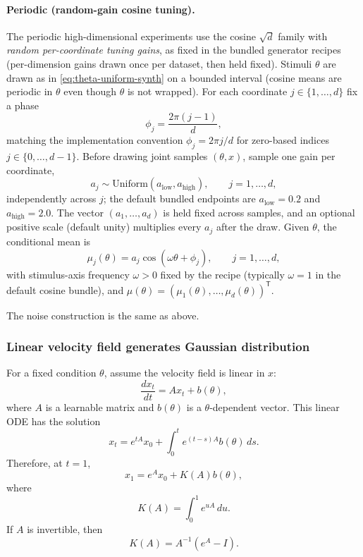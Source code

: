 \paragraph{Periodic (random-gain cosine tuning).}
The periodic high-dimensional experiments use the cosine $\sqrt{d}$ family with \emph{random per-coordinate tuning gains}, as fixed in the bundled generator recipes (per-dimension gains drawn once per dataset, then held fixed).
Stimuli $\theta$ are drawn as in \eqref{eq:theta-uniform-synth} on a bounded interval (cosine means are periodic in $\theta$ even though $\theta$ is not wrapped).
For each coordinate $j\in\{1,\ldots,d\}$ fix a phase
\begin{equation}
  \phi_j = \frac{2\pi(j-1)}{d},
\end{equation}
matching the implementation convention $\phi_j = 2\pi j/d$ for zero-based indices $j\in\{0,\ldots,d-1\}$.
Before drawing joint samples $(\theta,x)$, sample one gain per coordinate,
\begin{equation}
  a_j \sim \mathrm{Uniform}(a_{\mathrm{low}}, a_{\mathrm{high}}),
  \qquad j = 1,\ldots,d,
\end{equation}
independently across $j$; the default bundled endpoints are $a_{\mathrm{low}}=0.2$ and $a_{\mathrm{high}}=2.0$.
The vector $(a_1,\ldots,a_d)$ is held fixed across samples, and an optional positive scale (default unity) multiplies every $a_j$ after the draw.
Given $\theta$, the conditional mean is
\begin{equation}
  \mu_j(\theta) = a_j \cos(\omega \theta + \phi_j),
  \qquad j = 1,\ldots,d,
\end{equation}
with stimulus-axis frequency $\omega>0$ fixed by the recipe (typically $\omega=1$ in the default cosine bundle), and $\mu(\theta)=(\mu_1(\theta),\ldots,\mu_d(\theta))^{\mathsf{T}}$.

The noise construction is the same as above.

\subsubsection{Linear velocity field generates Gaussian distribution}

For a fixed condition $\theta$, assume the velocity field is linear in $x$:
\begin{equation}
    \frac{d x_t}{dt}
    =
    A x_t + b(\theta),
\end{equation}
where $A$ is a learnable matrix and $b(\theta)$ is a $\theta$-dependent vector. This linear ODE has the solution
\begin{equation}
    x_t
    =
    e^{tA}x_0
    +
    \int_0^t e^{(t-s)A} b(\theta)\,ds .
\end{equation}
Therefore, at $t=1$,
\begin{equation}
    x_1
    =
    e^A x_0
    +
    K(A)b(\theta),
\end{equation}
where
\begin{equation}
    K(A)
    =
    \int_0^1 e^{uA}\,du .
\end{equation}
If $A$ is invertible, then
\begin{equation}
    K(A)
    =
    A^{-1}(e^A-I).
\end{equation}

